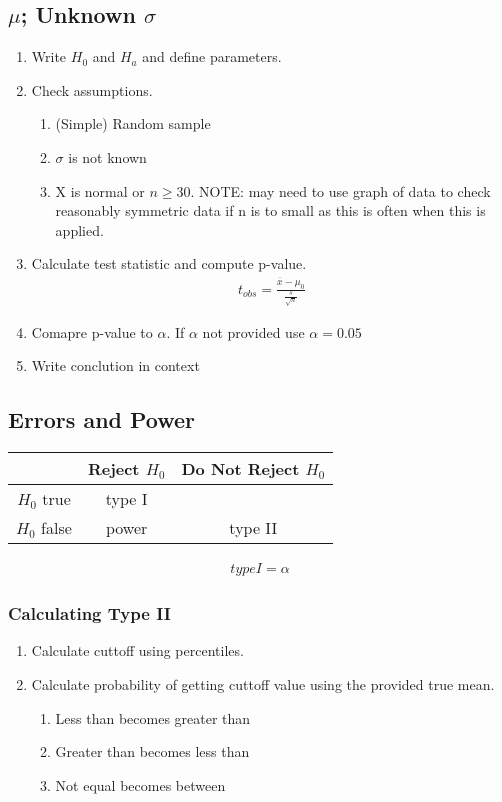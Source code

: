 \subsection{$\mu$; Unknown $\sigma$}
\begin{enumerate}
\item Write $H_0$ and $H_a$ and define parameters.
\item Check assumptions.
  \begin{enumerate}
  \item (Simple) Random sample
  \item $\sigma$ is not known
  \item X is normal or $n \geq 30$. NOTE: may need to use graph of data to check reasonably symmetric data if n is to small as this is often when this is applied.
  \end{enumerate}
\item Calculate test statistic and compute p-value.
  \begin{align}
    t_{obs} = \frac{\overbar{x} - \mu_0}{\frac{s}{\sqrt{n}}}
  \end{align}
\item Comapre p-value to $\alpha$. If $\alpha$ not provided use $\alpha = 0.05$
\item Write conclution in context
\end{enumerate}

\subsection{Errors and Power}
\begin{center}
  \begin{tabular}{|c|c|c|}
    \hline
    & Reject $H_0$ & Do Not Reject $H_0$ \\
    \hline
    $H_0$ true & type I & \\
    \hline
    $H_0$ false & power & type II \\
    \hline
  \end{tabular}
\end{center}

\begin{align}
  type I = \alpha
\end{align}

\subsubsection{Calculating Type II}
\begin{enumerate}
\item Calculate cuttoff using percentiles.
\item Calculate probability of getting cuttoff value using the provided true mean.
  \begin{enumerate}
  \item Less than becomes greater than
  \item Greater than becomes less than
  \item Not equal becomes between
  \end{enumerate}
\end{enumerate}
